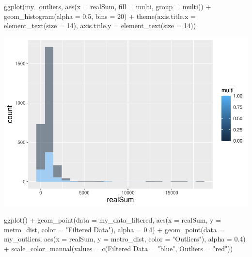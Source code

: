 \documentclass[
]{article}
\newenvironment{Shaded}{\begin{snugshade}}{\end{snugshade}}
\newcommand{\AttributeTok}[1]{\textcolor[rgb]{0.77,0.63,0.00}{#1}}
\newcommand{\DecValTok}[1]{\textcolor[rgb]{0.00,0.00,0.81}{#1}}
\newcommand{\FloatTok}[1]{\textcolor[rgb]{0.00,0.00,0.81}{#1}}
\newcommand{\FunctionTok}[1]{\textcolor[rgb]{0.00,0.00,0.00}{#1}}
\newcommand{\NormalTok}[1]{#1}
\newcommand{\OtherTok}[1]{\textcolor[rgb]{0.56,0.35,0.01}{#1}}
\newcommand{\SpecialCharTok}[1]{\textcolor[rgb]{0.00,0.00,0.00}{#1}}
\newcommand{\StringTok}[1]{\textcolor[rgb]{0.31,0.60,0.02}{#1}}
\begin{document}
\begin{Shaded}
\begin{Highlighting}[]
\FunctionTok{ggplot}\NormalTok{(my\_outliers, }\FunctionTok{aes}\NormalTok{(}\AttributeTok{x =}\NormalTok{ realSum, }\AttributeTok{fill =}\NormalTok{ multi, }\AttributeTok{group =}\NormalTok{ multi)) }\SpecialCharTok{+}
    \FunctionTok{geom\_histogram}\NormalTok{(}\AttributeTok{alpha =} \FloatTok{0.5}\NormalTok{, }\AttributeTok{bins =} \DecValTok{20}\NormalTok{) }\SpecialCharTok{+} \FunctionTok{theme}\NormalTok{(}\AttributeTok{axis.title.x =} \FunctionTok{element\_text}\NormalTok{(}\AttributeTok{size =} \DecValTok{14}\NormalTok{),}
    \AttributeTok{axis.title.y =} \FunctionTok{element\_text}\NormalTok{(}\AttributeTok{size =} \DecValTok{14}\NormalTok{))}
\end{Highlighting}
\end{Shaded}

\includegraphics{Project_files/figure-latex/unnamed-chunk-14-1.pdf}

\begin{Shaded}
\begin{Highlighting}[]
\FunctionTok{ggplot}\NormalTok{() }\SpecialCharTok{+} \FunctionTok{geom\_point}\NormalTok{(}\AttributeTok{data =}\NormalTok{ my\_data\_filtered, }\FunctionTok{aes}\NormalTok{(}\AttributeTok{x =}\NormalTok{ realSum,}
    \AttributeTok{y =}\NormalTok{ metro\_dist, }\AttributeTok{color =} \StringTok{"Filtered Data"}\NormalTok{), }\AttributeTok{alpha =} \FloatTok{0.4}\NormalTok{) }\SpecialCharTok{+}
    \FunctionTok{geom\_point}\NormalTok{(}\AttributeTok{data =}\NormalTok{ my\_outliers, }\FunctionTok{aes}\NormalTok{(}\AttributeTok{x =}\NormalTok{ realSum, }\AttributeTok{y =}\NormalTok{ metro\_dist,}
        \AttributeTok{color =} \StringTok{"Outliers"}\NormalTok{), }\AttributeTok{alpha =} \FloatTok{0.4}\NormalTok{) }\SpecialCharTok{+} \FunctionTok{scale\_color\_manual}\NormalTok{(}\AttributeTok{values =} \FunctionTok{c}\NormalTok{(}\StringTok{\textasciigrave{}}\AttributeTok{Filtered Data}\StringTok{\textasciigrave{}} \OtherTok{=} \StringTok{"blue"}\NormalTok{,}
    \AttributeTok{Outliers =} \StringTok{"red"}\NormalTok{))}
\end{Highlighting}
\end{Shaded}
\end{document}
